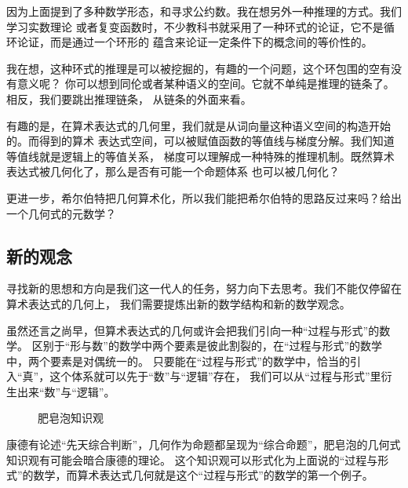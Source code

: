 \documentclass[a4paper,12pt]{article}
\numberwithin{problem}{section}
\numberwithin{definition}{section}
\numberwithin{lemma}{section}
\numberwithin{proposition}{section}
\numberwithin{theorem}{section}
\numberwithin{grammar}{section}
\numberwithin{program}{section}
\numberwithin{convention}{section}
\numberwithin{corollary}{section}
\begin{document}
因为上面提到了多种数学形态，和寻求公约数。我在想另外一种推理的方式。我们学习实数理论
或者复变函数时，不少教科书就采用了一种环式的论证，它不是循环论证，而是通过一个环形的
蕴含来论证一定条件下的概念间的等价性的。

我在想，这种环式的推理是可以被挖掘的，有趣的一个问题，这个环包围的空有没有意义呢？
你可以想到同伦或者某种语义的空间。它就不单纯是推理的链条了。相反，我们要跳出推理链条，
从链条的外面来看。

有趣的是，在算术表达式的几何里，我们就是从词向量这种语义空间的构造开始的。而得到的算术
表达式空间，可以被赋值函数的等值线与梯度分解。我们知道等值线就是逻辑上的等值关系，
梯度可以理解成一种特殊的推理机制。既然算术表达式被几何化了，那么是否有可能一个命题体系
也可以被几何化？

更进一步，希尔伯特把几何算术化，所以我们能把希尔伯特的思路反过来吗？给出一个几何式的元数学？

\subsection{新的观念}

寻找新的思想和方向是我们这一代人的任务，努力向下去思考。我们不能仅停留在算术表达式的几何上，
我们需要提炼出新的数学结构和新的数学观念。

虽然还言之尚早，但算术表达式的几何或许会把我们引向一种“过程与形式”的数学。
区别于“形与数”的数学中两个要素是彼此割裂的，在“过程与形式”的数学中，两个要素是对偶统一的。
只要能在“过程与形式”的数学中，恰当的引入“真”，这个体系就可以先于“数”与“逻辑”存在，
我们可以从“过程与形式”里衍生出来“数”与“逻辑”。

\begin{figure}[ht]
\centering
{}
\caption{肥皂泡知识观}
\end{figure}

康德有论述“先天综合判断”，几何作为命题都呈现为“综合命题”，肥皂泡的几何式知识观有可能会暗合康德的理论。
这个知识观可以形式化为上面说的“过程与形式”的数学，而算术表达式几何就是这个“过程与形式”的数学的第一个例子。
\end{document}
